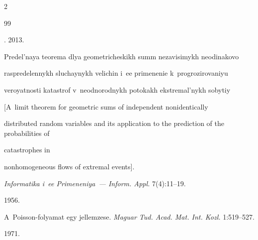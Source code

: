  \begin{multicols}{2}





\renewcommand{\bibname}{\protect\rmfamily References}







{\small\frenchspacing


 {%




 \begin{thebibliography}{99}







    . 2013.


    Predel'naya teorema dlya geometricheskikh summ ne\-za\-vi\-si\-mykh neodinakovo


    raspredelennykh sluchaynykh velichin i~ee primenenie k~progrozirovaniyu


    veroyatnosti ka\-tast\-rof v~neodnorodnykh potokakh ekstremal'nykh sobytiy


    [A~limit theorem for geometric sums of independent nonidentically


    distributed random variables and its application to the prediction of the probabilities of


    catastrophes in


    nonhomogeneous flows of extremal events].


    \textit{Informatika i~ee Primeneniya~--- Inform. Appl.} 7(4):11--19.


    




     1956.


    A~Poisson-folyamat egy jellemzese. \textit{Maguar Tud. Acad. Mat. Int. Kozl.} 1:519--527.


    




     1971.



\end{thebibliography}}}
\end{multicols}
